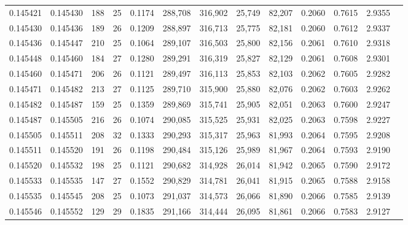 \begin{tabular}{rrrrrrrrrrrrr}
0.145421 & 0.145430 & 188 &  25 &                                     0.1174 & 288,708 & 316,902 &  25,749 &  82,207 & 0.2060 & 0.7615 & 2.9355 \\
0.145430 & 0.145436 & 189 &  26 &                                     0.1209 & 288,897 & 316,713 &  25,775 &  82,181 & 0.2060 & 0.7612 & 2.9337 \\
0.145436 & 0.145447 & 210 &  25 &                                     0.1064 & 289,107 & 316,503 &  25,800 &  82,156 & 0.2061 & 0.7610 & 2.9318 \\
0.145448 & 0.145460 & 184 &  27 &                                     0.1280 & 289,291 & 316,319 &  25,827 &  82,129 & 0.2061 & 0.7608 & 2.9301 \\
0.145460 & 0.145471 & 206 &  26 &                                     0.1121 & 289,497 & 316,113 &  25,853 &  82,103 & 0.2062 & 0.7605 & 2.9282 \\
0.145471 & 0.145482 & 213 &  27 &                                     0.1125 & 289,710 & 315,900 &  25,880 &  82,076 & 0.2062 & 0.7603 & 2.9262 \\
0.145482 & 0.145487 & 159 &  25 &                                     0.1359 & 289,869 & 315,741 &  25,905 &  82,051 & 0.2063 & 0.7600 & 2.9247 \\
0.145487 & 0.145505 & 216 &  26 &                                     0.1074 & 290,085 & 315,525 &  25,931 &  82,025 & 0.2063 & 0.7598 & 2.9227 \\
0.145505 & 0.145511 & 208 &  32 &                                     0.1333 & 290,293 & 315,317 &  25,963 &  81,993 & 0.2064 & 0.7595 & 2.9208 \\
0.145511 & 0.145520 & 191 &  26 &                                     0.1198 & 290,484 & 315,126 &  25,989 &  81,967 & 0.2064 & 0.7593 & 2.9190 \\
0.145520 & 0.145532 & 198 &  25 &                                     0.1121 & 290,682 & 314,928 &  26,014 &  81,942 & 0.2065 & 0.7590 & 2.9172 \\
0.145533 & 0.145535 & 147 &  27 &                                     0.1552 & 290,829 & 314,781 &  26,041 &  81,915 & 0.2065 & 0.7588 & 2.9158 \\
0.145535 & 0.145545 & 208 &  25 &                                     0.1073 & 291,037 & 314,573 &  26,066 &  81,890 & 0.2066 & 0.7585 & 2.9139 \\
0.145546 & 0.145552 & 129 &  29 &                                     0.1835 & 291,166 & 314,444 &  26,095 &  81,861 & 0.2066 & 0.7583 & 2.9127 \\

\end{tabular}
